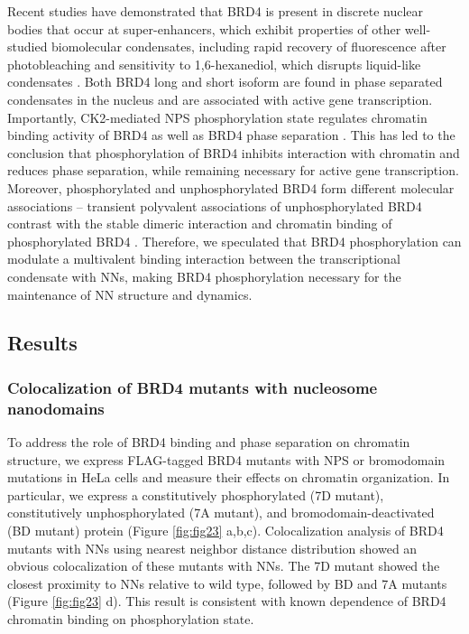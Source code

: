 Recent studies have demonstrated that BRD4 is present in discrete nuclear bodies that occur at super-enhancers, which exhibit properties of other well-studied biomolecular condensates, including rapid recovery of fluorescence after photobleaching and sensitivity to 1,6-hexanediol, which disrupts liquid-like condensates \parencite{Sabari2018}. Both BRD4 long and short isoform are found in phase separated condensates in the nucleus and are associated with active gene transcription. Importantly, CK2-mediated NPS phosphorylation state regulates chromatin binding activity of BRD4 as well as BRD4 phase separation \parencite{Han2020}. This has led to the conclusion that phosphorylation of BRD4 inhibits interaction with chromatin and reduces phase separation, while remaining necessary for active gene transcription. Moreover, phosphorylated and unphosphorylated BRD4 form different molecular associations – transient polyvalent associations of unphosphorylated BRD4 contrast with the stable dimeric interaction and chromatin binding of phosphorylated BRD4 \parencite{Malvezzi2021}. Therefore, we speculated that BRD4 phosphorylation can modulate a multivalent binding interaction between the transcriptional condensate with NNs, making BRD4 phosphorylation necessary for the maintenance of NN structure and dynamics.


\subsection{Results}

\subsubsection{Colocalization of BRD4 mutants with nucleosome nanodomains}

To address the role of BRD4 binding and phase separation on chromatin structure, we express FLAG-tagged BRD4 mutants with NPS or bromodomain mutations in HeLa cells and measure their effects on chromatin organization. In particular, we express a constitutively phosphorylated (7D mutant), constitutively unphosphorylated (7A mutant), and bromodomain-deactivated (BD mutant) protein (Figure \ref{fig:fig23} a,b,c). Colocalization analysis of BRD4 mutants with NNs using nearest neighbor distance distribution showed an obvious colocalization of these mutants with NNs. The 7D mutant showed the closest proximity to NNs relative to wild type, followed by BD and 7A mutants (Figure \ref{fig:fig23} d).  This result is consistent with known dependence of BRD4 chromatin binding on phosphorylation state. 


